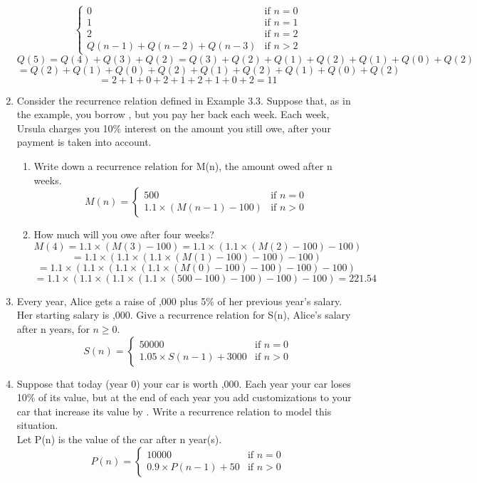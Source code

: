 \documentclass[12pt]{article}
\begin{document}
\begin{enumerate}
\[\begin{cases}
    0 &     \text{if } n = 0 \\
    1 & \text{if } n = 1\\
    2 & \text{if } n = 2\\
    Q(n-1) + Q(n-2) + Q(n-3) & \text{if } n > 2
    \end{cases}
    \]
    \[Q(5) = Q(4) + Q(3) + Q(2) = Q(3) + Q(2) + Q(1) + Q(2) + Q(1) + Q(0) + Q(2)\]
    \[=  Q(2) + Q(1) + Q(0) + Q(2) + Q(1) + Q(2) + Q(1) + Q(0) + Q(2)\]
    \[= 2 + 1 + 0 + 2 + 1 + 2 + 1 + 0 + 2 = 11\]
    \item Consider the recurrence relation defined in Example 3.3. Suppose that, as in the example, you borrow , but you pay her back  each week. Each week, Ursula charges you 10\% interest on the amount you still owe, after your  payment is taken into account.
    \begin{enumerate}
        \item Write down a recurrence relation for M(n), the amount owed after n weeks.
        \[
        M(n) = 
        \begin{cases} 
        500 &     \text{if } n = 0 \\
        1.1 \times (M(n-1)-100) & \text{if } n > 0
        \end{cases}
        \]
        \item How much will you owe after four weeks?
        \[M(4) = 1.1 \times (M(3)-100) = 1.1 \times (1.1 \times (M(2) - 100) - 100)\]
        \[ = 1.1 \times (1.1 \times (1.1\times (M(1) - 100) - 100) - 100)\]
        \[ = 1.1 \times (1.1 \times (1.1\times (1.1\times (M(0) - 100) - 100) - 100) - 100)\]
        \[ = 1.1 \times (1.1 \times (1.1\times (1.1\times (500 - 100) - 100) - 100) - 100) = 221.54\]
    \end{enumerate}
    \item Every year, Alice gets a raise of ,000 plus 5\% of her previous year’s salary. Her starting salary is ,000. Give a recurrence relation for S(n), Alice’s salary after n years, for $n \geq 0$.
    \[
    S(n) = 
    \begin{cases} 
    50000 &     \text{if } n = 0 \\
    1.05 \times S(n-1) + 3000 & \text{if } n > 0
    \end{cases}
    \]
    \item Suppose that today (year 0) your car is worth ,000. Each year your car loses 10\% of its value, but at the end of each year you add customizations to your car that increase its value by . Write a recurrence relation to model this situation.\\
    Let P(n) is the value of the car after n year(s).
    \[
    P(n) = 
    \begin{cases} 
    10000 &     \text{if } n = 0 \\
    0.9 \times P(n-1) + 50 & \text{if } n > 0
    \end{cases}
    \]
\end{enumerate}
\end{document}
